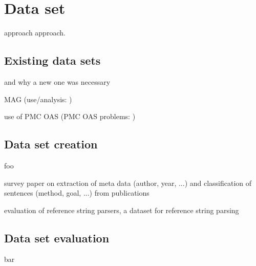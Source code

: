 \chapter{Data set}\label{chap:dataset}
approach approach.

\section{Existing data sets}
and why a new one was necessary

MAG\cite{Sinha2015} (use/analysis: \cite{Herrmannova2016,Paszcza2016,Hug2017})

use of PMC OAS\cite{Gipp2015,Duma2016,Galke2018,Bhagavatula2018} (PMC OAS problems: \cite{Gipp2015})

\section{Data set creation}
foo

survey paper on extraction of meta data (author, year, ...) and classification of sentences (method, goal, ...) from publications\cite{Nasar2018}

evaluation of reference string parsers\cite{Tkaczyk2018}, a dataset for reference string parsing\cite{Anzaroot2013}

\section{Data set evaluation}
bar
